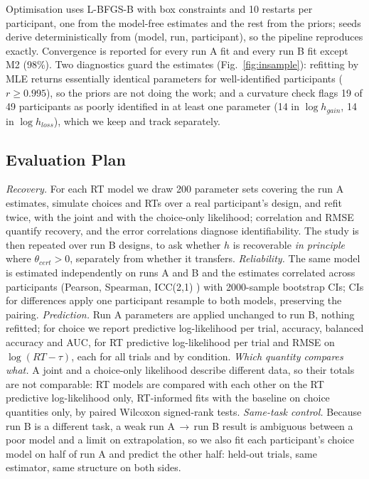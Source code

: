 \documentclass[11pt,a4paper]{article}
\begin{document}
Optimisation uses L-BFGS-B with box constraints and 10 restarts per participant, one from the
model-free estimates and the rest from the priors; seeds derive deterministically from (model,
run, participant), so the pipeline reproduces exactly. Convergence is reported for every run A
fit and every run B fit except M2 (98\%). Two diagnostics guard the estimates
(Fig.~\ref{fig:insample}): refitting by MLE returns essentially identical parameters for
well-identified participants ($r\ge0.995$), so the priors are not doing the work; and a
curvature check flags 19 of 49 participants as poorly identified in at least one parameter (14
in $\log h_{gain}$, 14 in $\log h_{loss}$), which we keep and track separately.

\subsection{Evaluation Plan}

\emph{Recovery.} For each RT model we draw 200 parameter sets covering the run A estimates,
simulate choices and RTs over a real participant's design, and refit twice, with the joint and
with the choice-only likelihood; correlation and RMSE quantify recovery, and the error
correlations diagnose identifiability. The study is then repeated over run B
designs, to ask whether $h$ is recoverable \emph{in principle} where $\theta_{cert}>0$,
separately from whether it transfers.
\emph{Reliability.} The same model is estimated independently on runs A and B and the estimates
correlated across participants (Pearson, Spearman, ICC(2,1) \citep{shrout1979}) with
2000-sample bootstrap CIs; CIs for differences apply one participant resample to both models,
preserving the pairing.
\emph{Prediction.} Run A parameters are applied unchanged to run B, nothing refitted; for choice
we report predictive log-likelihood per trial, accuracy, balanced accuracy and AUC, for RT
predictive log-likelihood per trial and RMSE on $\log(RT-\tau)$, each for all trials and by
condition.
\emph{Which quantity compares what.} A joint and a choice-only likelihood describe different
data, so their totals are not comparable: RT models are compared with each other on the RT
predictive log-likelihood only, RT-informed fits with the baseline on choice quantities only, by
paired Wilcoxon signed-rank tests.
\emph{Same-task control.} Because run B is a different task, a weak run A\,$\to$\,run B result is
ambiguous between a poor model and a limit on extrapolation, so we also fit each participant's
choice model on half of run A and predict the other half: held-out trials, same estimator, same
structure on both sides.
\end{document}
